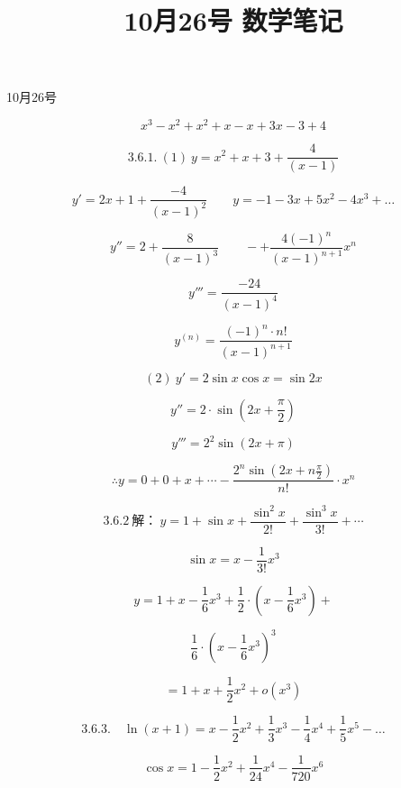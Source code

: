 \documentclass[UTF8,fontset=windows]{ctexart}
\title{10月26号 数学笔记}
\begin{document}
\maketitle
10月26号

\[
x^3 - x^2 + x^2 + x - x + 3x - 3 + 4
\]

\[
3.6.1.\ (1)\ y = x^2 + x + 3 + \frac{4}{(x-1)}
\]

\[
y' = 2x + 1 + \frac{-4}{(x-1)^2} \qquad y = -1 - 3x + 5x^2 - 4x^3 + \dots
\]

\[
y'' = 2 + \frac{8}{(x-1)^3} \qquad - + \frac{4(-1)^n}{(x-1)^{n+1}} x^n
\]

\[
y''' = \frac{-24}{(x-1)^4}
\]

\[
y^{(n)} = \frac{(-1)^n \cdot n!}{(x-1)^{n+1}}
\]

\[
(2)\ y' = 2\sin x \cos x = \sin 2x
\]

\[
y'' = 2 \cdot \sin(2x + \frac{\pi}{2})
\]

\[
y''' = 2^2 \sin(2x + \pi)
\]

\[
\therefore y = 0 + 0 + x + \cdots - \frac{2^n \sin(2x + n\frac{\pi}{2})}{n!} \cdot x^n
\]

\[
3.6.2\ \text{解：}\ y = 1 + \sin x + \frac{\sin^2 x}{2!} + \frac{\sin^3 x}{3!} + \cdots
\]

\[
\sin x = x - \frac{1}{3!}x^3
\]

\[
y = 1 + x - \frac{1}{6}x^3 + \frac{1}{2} \cdot (x - \frac{1}{6}x^3) +
\]

\[
\frac{1}{6} \cdot (x - \frac{1}{6}x^3)^3
\]

\[
= 1 + x + \frac{1}{2}x^2 + o(x^3)
\]

\[
3.6.3.\quad \ln(x+1) = x - \frac{1}{2}x^2 + \frac{1}{3}x^3 - \frac{1}{4}x^4 + \frac{1}{5}x^5 - \dots
\]

\[
\cos x = 1 - \frac{1}{2}x^2 + \frac{1}{24}x^4 - \frac{1}{720}x^6
\]
\end{document}
